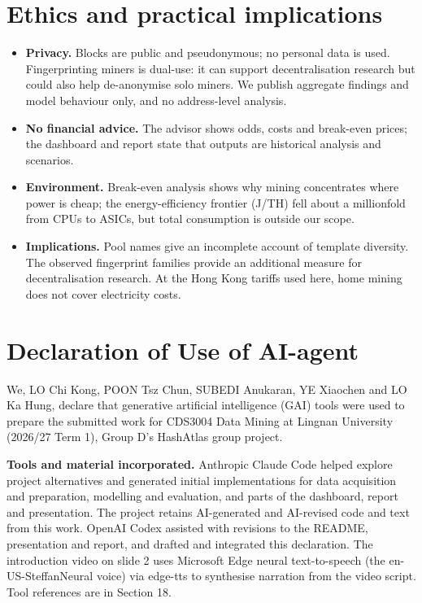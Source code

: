 \documentclass[
  11pt,
  a4paper,
]{article}
\providecommand{\tightlist}{%
  \setlength{\itemsep}{0pt}\setlength{\parskip}{0pt}}
\newcommand{\code}[1]{{\ttfamily\color{ReportInkTwo}#1}}
\begin{document}
\section{Ethics and practical
implications}\label{ethics-and-practical-implications}

\begin{itemize}
\tightlist
\item
  \textbf{Privacy.} Blocks are public and pseudonymous; no personal data
  is used. Fingerprinting miners is dual-use: it can support
  decentralisation research but could also help de-anonymise solo
  miners. We publish aggregate findings and model behaviour only, and no
  address-level analysis.
\item
  \textbf{No financial advice.} The advisor shows odds, costs and
  break-even prices; the dashboard and report state that outputs are
  historical analysis and scenarios.
\item
  \textbf{Environment.} Break-even analysis shows why mining
  concentrates where power is cheap; the energy-efficiency frontier
  (J/TH) fell about a millionfold from CPUs to ASICs, but total
  consumption is outside our scope.
\item
  \textbf{Implications.} Pool names give an incomplete account of
  template diversity. The observed fingerprint families provide an
  additional measure for decentralisation research. At the Hong Kong
  tariffs used here, home mining does not cover electricity costs.
\end{itemize}


\section{Declaration of Use of
AI-agent}\label{declaration-of-use-of-ai-agent}

We, LO Chi Kong, POON Tsz Chun, SUBEDI Anukaran, YE Xiaochen and LO Ka
Hung, declare that generative artificial intelligence (GAI) tools were
used to prepare the submitted work for CDS3004 Data Mining at Lingnan
University (2026/27 Term 1), Group D's HashAtlas group project.

\textbf{Tools and material incorporated.} Anthropic Claude Code helped
explore project alternatives and generated initial implementations for
data acquisition and preparation, modelling and evaluation, and parts of
the dashboard, report and presentation. The project retains AI-generated
and AI-revised code and text from this work. OpenAI Codex assisted with
revisions to the README, presentation and report, and drafted and
integrated this declaration. The introduction video on slide 2 uses
Microsoft Edge neural text-to-speech (the \code{en-US-SteffanNeural}
voice) via \code{edge-tts} to synthesise narration from the video
script. Tool references are in Section 18.
\end{document}
